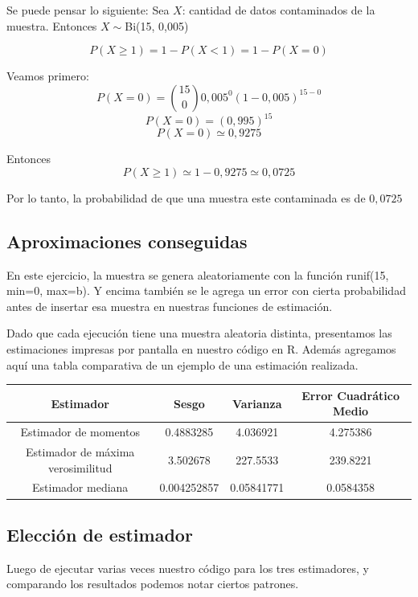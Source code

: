 \documentclass[a4paper]{article}
\begin{document}
Se puede pensar lo siguiente: \newline \newline
Sea $X$: cantidad de datos contaminados de la muestra. \newline
Entonces $X\sim$Bi(15, 0,005)

\[
P(X \geq 1) = 1 - P(X < 1) = 1 - P(X = 0)
\]

Veamos primero: 
\[
P(X = 0) = {{15}\choose{0}} 0,005^{0} (1-0,005)^{15-0}
\]
\[
P(X = 0) = (0,995)^{15}
\]
\[
P(X = 0) \simeq 0,9275
\]

Entonces 
\[
P(X \geq 1) \simeq 1 - 0,9275 \simeq 0,0725
\]

Por lo tanto, la probabilidad de que una muestra este contaminada es de $0,0725$

\subsection{Aproximaciones conseguidas}
En este ejercicio, la muestra se genera aleatoriamente con la función runif(15, min=0, max=b). Y encima también se le agrega un error con cierta probabilidad antes de insertar esa muestra en nuestras funciones de estimación. 

Dado que cada ejecución tiene una muestra aleatoria distinta, presentamos las estimaciones impresas por pantalla en nuestro código en R. Además agregamos aquí una tabla comparativa de un ejemplo de una estimación realizada. 

\begin{center}
 \begin{tabular}{||c | c | c | c||} 
 \hline
 Estimador & Sesgo & Varianza & Error Cuadrático Medio \\ [0.5ex] 
 \hline\hline
 Estimador de momentos &  0.4883285 & 4.036921 & 4.275386 \\ 
 \hline
 Estimador de máxima verosimilitud & 3.502678 & 227.5533 & 239.8221\\
 \hline
 Estimador mediana & 0.004252857 & 0.05841771 & 0.0584358 \\ [1ex] 
 \hline
\end{tabular}
\end{center}

\subsection{Elección de estimador}
Luego de ejecutar varias veces nuestro código para los tres estimadores, y comparando los resultados podemos notar ciertos patrones. 
\end{document}
